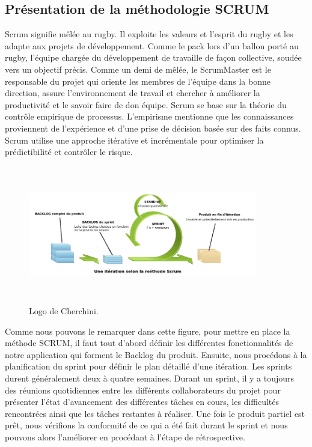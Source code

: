   \subsection{Pr\'{e}sentation de la m\'{e}thodologie SCRUM}
Scrum signifie m\^{e}l\'{e}e au rugby. Il exploite les valeurs et l'esprit du rugby et les adapte aux
projets de d\'{e}veloppement. Comme le pack lors d'un ballon port\'{e} au rugby, l'\'{e}quipe charg\'{e}e du
d\'{e}veloppement de travaille de fa\c{c}on collective, soud\'{e}e vers un objectif pr\'{e}cis. Comme un demi
de m\^{e}l\'{e}e, le ScrumMaster est le responsable du projet qui oriente les membres de l'\'{e}quipe dans
la bonne direction, assure l'environnement de travail et chercher \`{a} am\'{e}liorer la productivit\'{e} et
le savoir faire de don \'{e}quipe.
Scrum se base sur la th\'{e}orie du contr\^{o}le empirique de processus. L'empirisme mentionne que
les connaissances proviennent de l'exp\'{e}rience et d'une prise de d\'{e}cision bas\'{e}e sur des faits
connus. Scrum utilise une approche it\'{e}rative et incr\'{e}mentale pour optimiser la pr\'{e}dictibilit\'{e} et
contr\^{o}ler le risque.
\begin{figure}[H]
\center
\includegraphics[width=10cm,height=6cm]{./figures/scrum.png}
\caption{Logo de Cherchini.}

\end{figure}

Comme nous pouvons le remarquer dans cette figure, pour mettre en place la m\'{e}thode
SCRUM, il faut tout d'abord d\'{e}finir les diff\'{e}rentes fonctionnalit\'{e}s de notre application qui
forment le Backlog du produit. Ensuite, nous proc\'{e}dons \`{a} la planification du sprint pour d\'{e}finir
le plan d\'{e}taill\'{e} d'une it\'{e}ration. Les sprints durent g\'{e}n\'{e}ralement deux \`{a} quatre semaines. Durant
un sprint, il y a toujours des r\'{e}unions quotidiennes entre les diff\'{e}rents collaborateurs du projet
pour pr\'{e}senter l'\'{e}tat d'avancement des diff\'{e}rentes t\^{a}ches en cours, les difficult\'{e}s rencontr\'{e}es
ainsi que les t\^{a}ches restantes \`{a} r\'{e}aliser. Une fois le produit partiel est pr\^{e}t, nous v\'{e}rifions la
conformit\'{e} de ce qui a \'{e}t\'{e} fait durant le sprint et nous pouvons alors l'am\'{e}liorer en proc\'{e}dant \`{a}
l'\'{e}tape de r\'{e}trospective.

